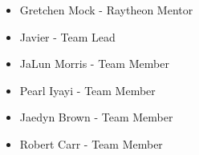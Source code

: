 
\begin{itemize}
  \item Gretchen Mock - Raytheon Mentor
  \item Javier - Team Lead
  \item JaLun Morris - Team Member
  \item Pearl Iyayi - Team Member
  \item Jaedyn Brown - Team Member
  \item Robert Carr - Team Member
\end{itemize}